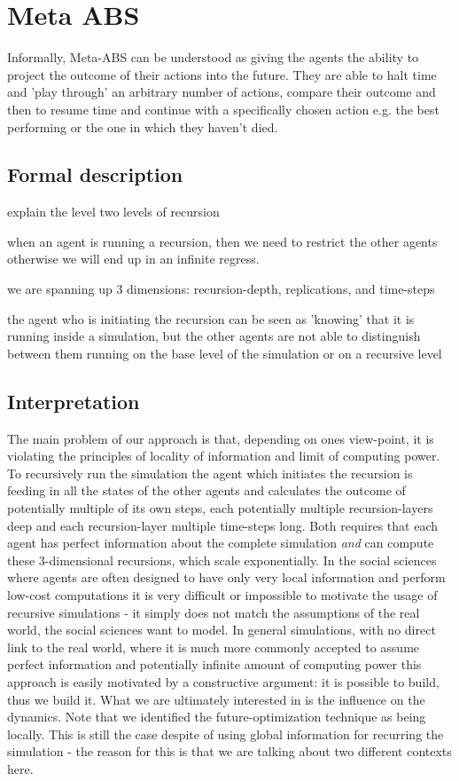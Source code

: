 \section{Meta ABS}
Informally, Meta-ABS can be understood as giving the agents the ability to project the outcome of their actions into the future. They are able to halt time and 'play through' an arbitrary number of actions, compare their outcome and then to resume time and continue with a specifically chosen action e.g. the best performing or the one in which they haven't died.

\subsection{Formal description}
explain the level two levels of recursion

when an agent is running a recursion, then we need to restrict the other agents otherwise we will end up in an infinite regress.

we are spanning up 3 dimensions: recursion-depth, replications, and time-steps

the agent who is initiating the recursion can be seen as 'knowing' that it is running inside a simulation, but the other agents are not able to distinguish between them running on the base level of the simulation or on a recursive level

\subsection{Interpretation}
The main problem of our approach is that, depending on ones view-point, it is violating the principles of locality of information and limit of computing power. To recursively run the simulation the agent which initiates the recursion is feeding in all the states of the other agents and calculates the outcome of potentially multiple of its own steps, each potentially multiple recursion-layers deep and each recursion-layer multiple time-steps long. Both requires that each agent has perfect information about the complete simulation \textit{and} can compute these 3-dimensional recursions, which scale exponentially.
In the social sciences where agents are often designed to have only very local information and perform low-cost computations it is very difficult or impossible to motivate the usage of recursive simulations - it simply does not match the assumptions of the real world, the social sciences want to model.
In general simulations, with no direct link to the real world, where it is much more commonly accepted to assume perfect information and potentially infinite amount of computing power this approach is easily motivated by a constructive argument: it is possible to build, thus we build it.
What we are ultimately interested in is the influence on the dynamics.
Note that we identified the future-optimization technique as being locally. This is still the case despite of using global information for recurring the simulation - the reason for this is that we are talking about two different contexts here.